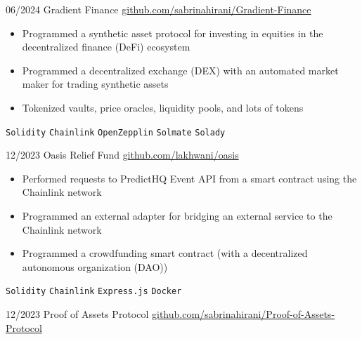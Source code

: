 \documentclass[9pt]{developercv} %
\begin{document}
\begin{entrylist}
    \entry
		{06/2024}
		{Gradient Finance}
		{\href{https://github.com/sabrinahirani/Gradient-Finance}{github.com/sabrinahirani/Gradient-Finance}}
		{
        \vspace{-10pt}
        \begin{itemize}[itemsep=3pt,topsep=0pt,parsep=0pt,partopsep=0pt, leftmargin=-1pt]
            \item Programmed a synthetic asset protocol for investing in equities in the decentralized finance (DeFi) ecosystem
            \item Programmed a decentralized exchange (DEX) with an automated market maker for trading synthetic assets
            \item Tokenized vaults, price oracles, liquidity pools, and lots of tokens
        \end{itemize} 
        \vspace{5pt}
        \texttt{Solidity} \slashsep \texttt{Chainlink} \slashsep \texttt{OpenZepplin} \slashsep \texttt{Solmate} \slashsep \texttt{Solady}
        }
    \entry
		{12/2023}
		{Oasis Relief Fund}
		{\href{https://github.com/lakhwani/oasis}{github.com/lakhwani/oasis}}
		{
        \vspace{-10pt}
        \begin{itemize}[itemsep=3pt,topsep=0pt,parsep=0pt,partopsep=0pt, leftmargin=-1pt]
            \item Performed requests to PredictHQ Event API from a smart contract using the Chainlink network
            \item Programmed an external adapter for bridging an external service to the Chainlink network
            \item Programmed a crowdfunding smart contract (with a decentralized autonomous organization (DAO))
        \end{itemize} 
        \vspace{5pt}
        \texttt{Solidity} \slashsep \texttt{Chainlink} \slashsep \texttt{Express.js} \slashsep \texttt{Docker}
        }
    \entry
		{12/2023}
		{Proof of Assets Protocol}
		{\href{https://github.com/sabrinahirani/Proof-of-Assets-Protocol}{github.com/sabrinahirani/Proof-of-Assets-Protocol}}
		{
        \vspace{-10pt}
        \begin{itemize}[itemsep=3pt,topsep=0pt,parsep=0pt,partopsep=0pt, leftmargin=-1pt]

\end{itemize}}
\end{entrylist}
\end{document}
